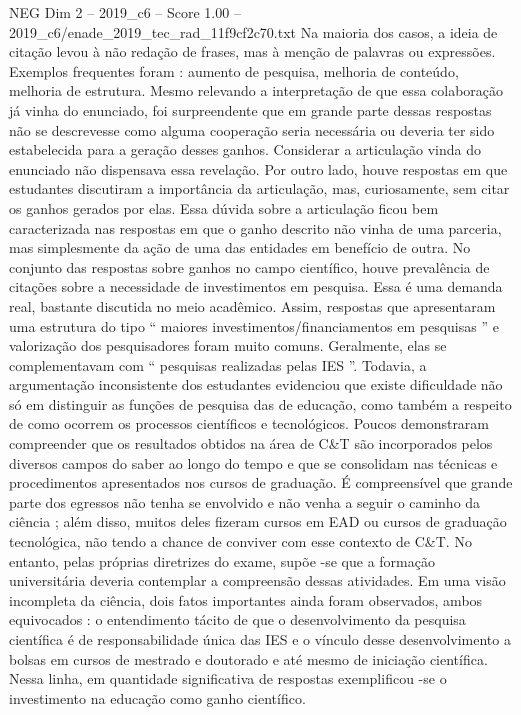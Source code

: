 \begin{textsample}{NEG Dim 2 – 2019\_c6 – Score 1.00 – 2019\_c6/enade\_2019\_tec\_rad\_11f9cf2c70.txt}
Na maioria dos casos, a ideia de citação levou à não redação de frases, mas à menção de palavras ou expressões.
Exemplos frequentes foram : aumento de pesquisa, melhoria de conteúdo, melhoria de estrutura.
Mesmo relevando a interpretação de que essa colaboração já vinha do enunciado, foi surpreendente que em grande parte dessas respostas não se descrevesse como alguma cooperação seria necessária ou deveria ter sido estabelecida para a geração desses ganhos.
Considerar a articulação vinda do enunciado não dispensava essa revelação.
Por outro lado, houve respostas em que estudantes discutiram a importância da articulação, mas, curiosamente, sem citar os ganhos gerados por elas.
Essa dúvida sobre a articulação ficou bem caracterizada nas respostas em que o ganho descrito não vinha de uma parceria, mas simplesmente da ação de uma das entidades em benefício de outra.
No conjunto das respostas sobre ganhos no campo científico, houve prevalência de citações sobre a necessidade de investimentos em pesquisa.
Essa é uma demanda real, bastante discutida no meio acadêmico.
Assim, respostas que apresentaram uma estrutura do tipo “ maiores investimentos/financiamentos em pesquisas ” e valorização dos pesquisadores foram muito comuns.
Geralmente, elas se complementavam com “ pesquisas realizadas pelas IES ”.
Todavia, a argumentação inconsistente dos estudantes evidenciou que existe dificuldade não só em distinguir as funções de pesquisa das de educação, como também a respeito de como ocorrem os processos científicos e tecnológicos.
Poucos demonstraram compreender que os resultados obtidos na área de C\&T são incorporados pelos diversos campos do saber ao longo do tempo e que se consolidam nas técnicas e procedimentos apresentados nos cursos de graduação.
É compreensível que grande parte dos egressos não tenha se envolvido e não venha a seguir o caminho da ciência ; além disso, muitos deles fizeram cursos em EAD ou cursos de graduação tecnológica, não tendo a chance de conviver com esse contexto de C\&T.
No entanto, pelas próprias diretrizes do exame, supõe -se que a formação universitária deveria contemplar a compreensão dessas atividades.
Em uma visão incompleta da ciência, dois fatos importantes ainda foram observados, ambos equivocados : o entendimento tácito de que o desenvolvimento da pesquisa científica é de responsabilidade única das IES e o vínculo desse desenvolvimento a bolsas em cursos de mestrado e doutorado e até mesmo de iniciação científica.
Nessa linha, em quantidade significativa de respostas exemplificou -se o investimento na educação como ganho científico.

\end{textsample}
